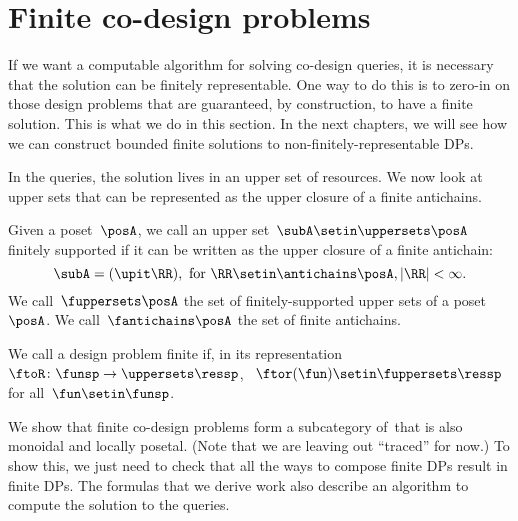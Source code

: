 \section{Finite co-design problems}

If we want a computable algorithm for solving co-design queries, it is necessary that the solution can be finitely representable.
One way to do this is to zero-in on those design problems that are guaranteed, by construction, to have a finite solution.
This is what we do in this section.
In the next chapters, we will see how we can construct bounded finite solutions to non-finitely-representable DPs.

In the \FixFunMinRes queries, the solution lives in an upper set of resources.
We now look at upper sets that can be represented as the upper closure of a finite antichains.

\begin{definition}
    \label{def:fuppersets}
    Given a poset~$\posA$, we call an upper set~$\subA \setin \uppersets \posA$ finitely supported
    if it can be written as the upper closure of a finite antichain:
    \begin{equation*}
        \subA = (\upit\RR), \text{ for } \RR \setin \antichains \posA, \vert\RR\vert < \infty.
    \end{equation*}
    We call~$\fuppersets \posA$ the set of finitely-supported upper sets of a poset~$\posA$.
    We call~$\fantichains \posA$ the set of finite antichains.
\end{definition}

\begin{definition}
    \label{def:finite_des_prob}
    We call a design problem finite if, in its representation~$\ftoR \colon \funsp \to \uppersets \ressp$,
    ~$\ftor(\fun) \setin \fuppersets\ressp$ for all~$\fun\setin\funsp$.
\end{definition}

We show that finite co-design problems form a subcategory of~\DP that is also monoidal and locally posetal.
(Note that we are leaving out ``traced'' for now.) To show this, we just need to check that all the ways to compose finite DPs result in finite DPs.
The formulas that we derive work also describe an algorithm to compute the solution to the queries.

